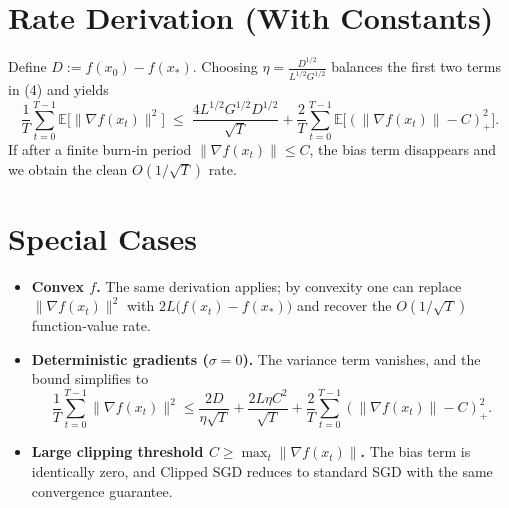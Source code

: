 \documentclass{article}
\newcommand{\EE}{\mathbb{E}}
\begin{document}
\section*{Rate Derivation (With Constants)}
Define $D:=f(x_0)-f(x_*)$. Choosing $\eta = \frac{D^{1/2}}{L^{1/2}G^{1/2}}$ balances the first two terms in (4) and yields
\[
\frac{1}{T}\sum_{t=0}^{T-1}\EE\!\big[\|\nabla f(x_t)\|^{2}\big]
\;\le\;
\frac{4L^{1/2}G^{1/2}D^{1/2}}{\sqrt{T}}
   +\frac{2}{T}\sum_{t=0}^{T-1}
        \EE\!\big[(\|\nabla f(x_t)\|-C)_+^{2}\big].
\]
If after a finite burn‑in period $\|\nabla f(x_t)\|\le C$, the bias term disappears and we obtain the clean $O(1/\sqrt{T})$ rate.

\section*{Special Cases}
\begin{itemize}
\item \textbf{Convex $f$.} The same derivation applies; by convexity one can replace $\|\nabla f(x_t)\|^{2}$ with $2L\big(f(x_t)-f(x_*)\big)$ and recover the $O(1/\sqrt{T})$ function‑value rate.
\item \textbf{Deterministic gradients ($\sigma=0$).} The variance term vanishes, and the bound simplifies to
\[
\frac{1}{T}\sum_{t=0}^{T-1}\|\nabla f(x_t)\|^{2}
\le
\frac{2D}{\eta\sqrt{T}}
   +\frac{2L\eta C^{2}}{\sqrt{T}}
   +\frac{2}{T}\sum_{t=0}^{T-1}(\|\nabla f(x_t)\|-C)_+^{2}.
\]
\item \textbf{Large clipping threshold $C\ge \max_t\|\nabla f(x_t)\|$.}
The bias term is identically zero, and Clipped SGD reduces to standard SGD with the same convergence guarantee.
\end{itemize}
\end{document}
